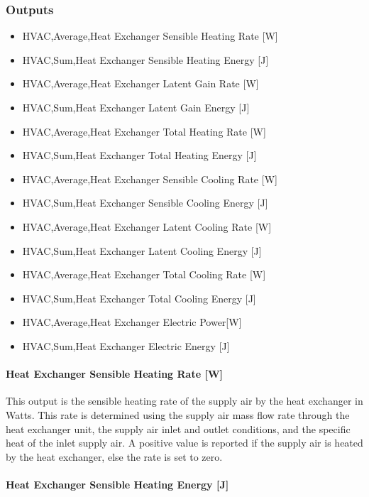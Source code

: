 \subsubsection{Outputs}\label{outputs-014}

\begin{itemize}
\item
  HVAC,Average,Heat Exchanger Sensible Heating Rate {[}W{]}
\item
  HVAC,Sum,Heat Exchanger Sensible Heating Energy {[}J{]}
\item
  HVAC,Average,Heat Exchanger Latent Gain Rate {[}W{]}
\item
  HVAC,Sum,Heat Exchanger Latent Gain Energy {[}J{]}
\item
  HVAC,Average,Heat Exchanger Total Heating Rate {[}W{]}
\item
  HVAC,Sum,Heat Exchanger Total Heating Energy {[}J{]}
\item
  HVAC,Average,Heat Exchanger Sensible Cooling Rate {[}W{]}
\item
  HVAC,Sum,Heat Exchanger Sensible Cooling Energy {[}J{]}
\item
  HVAC,Average,Heat Exchanger Latent Cooling Rate {[}W{]}
\item
  HVAC,Sum,Heat Exchanger Latent Cooling Energy {[}J{]}
\item
  HVAC,Average,Heat Exchanger Total Cooling Rate {[}W{]}
\item
  HVAC,Sum,Heat Exchanger Total Cooling Energy {[}J{]}
\item
  HVAC,Average,Heat Exchanger Electric Power{[}W{]}
\item
  HVAC,Sum,Heat Exchanger Electric Energy {[}J{]}
\end{itemize}

\paragraph{Heat Exchanger Sensible Heating Rate {[}W{]}}\label{heat-exchanger-sensible-heating-rate-w}

This output is the sensible heating rate of the supply air by the heat exchanger in Watts. This rate is determined using the supply air mass flow rate through the heat exchanger unit, the supply air inlet and outlet conditions, and the specific heat of the inlet supply air. A positive value is reported if the supply air is heated by the heat exchanger, else the rate is set to zero.

\paragraph{Heat Exchanger Sensible Heating Energy {[}J{]}}\label{heat-exchanger-sensible-heating-energy-j}

